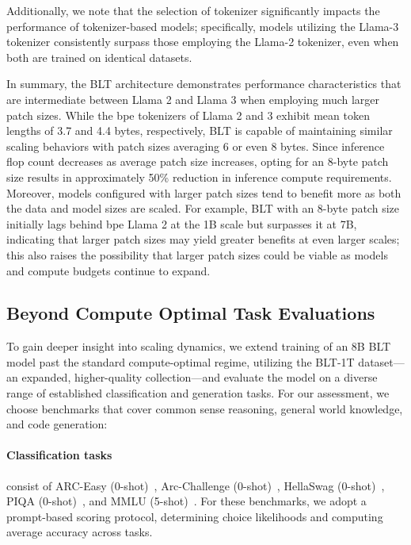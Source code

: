Additionally, we note that the selection of tokenizer significantly impacts the performance of tokenizer-based models; specifically, models utilizing the Llama-3 tokenizer consistently surpass those employing the Llama-2 tokenizer, even when both are trained on identical datasets.

In summary, the {\textsc BLT} architecture demonstrates performance characteristics that are intermediate between Llama 2 and Llama 3 when employing much larger patch sizes. While the bpe tokenizers of Llama 2 and 3 exhibit mean token lengths of 3.7 and 4.4 bytes, respectively, {\textsc BLT} is capable of maintaining similar scaling behaviors with patch sizes averaging 6 or even 8 bytes. Since inference flop count decreases as average patch size increases, opting for an 8-byte patch size results in approximately 50\% reduction in inference compute requirements. Moreover, models configured with larger patch sizes tend to benefit more as both the data and model sizes are scaled. For example, {\textsc BLT} with an 8-byte patch size initially lags behind bpe Llama 2 at the 1B scale but surpasses it at 7B, indicating that larger patch sizes may yield greater benefits at even larger scales; this also raises the possibility that larger patch sizes could be viable as models and compute budgets continue to expand.

\subsection{Beyond Compute Optimal Task Evaluations}
\label{section:evals}
To gain deeper insight into scaling dynamics, we extend training of an 8B {\textsc BLT} model past the standard compute-optimal regime, utilizing the {\textsc BLT}-1T dataset—an expanded, higher-quality collection—and evaluate the model on a diverse range of established classification and generation tasks. For our assessment, we choose benchmarks that cover common sense reasoning, general world knowledge, and code generation:

\paragraph{Classification tasks} consist of ARC-Easy (0-shot)~\citep{Eval_ARC}, Arc-Challenge (0-shot)~\citep{Eval_ARC}, HellaSwag (0-shot)~\citep{Eval_hellaswag}, PIQA (0-shot)~\citep{Eval_piqa}, and MMLU (5-shot)~\citep{hendrycks2020measuring}. For these benchmarks, we adopt a prompt-based scoring protocol, determining choice likelihoods and computing average accuracy across tasks.

